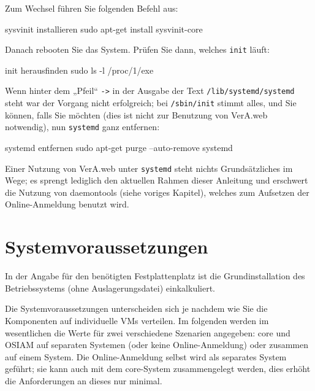 \documentclass{tarentanleitung}
\begin{document}
\begin{minipage}{\linewidth}
Zum Wechsel führen Sie folgenden Befehl aus:

\begin{lstdump}{sysvinit installieren}
sudo apt-get install sysvinit-core
\end{lstdump}

Danach rebooten Sie das System. Prüfen Sie dann, welches \texttt{init} läuft:

\begin{lstdump}{init herausfinden}
sudo ls -l /proc/1/exe
\end{lstdump}

Wenn hinter dem „Pfeil“ \texttt{->} in der Ausgabe der Text
\texttt{/lib/systemd/systemd} steht war der Vorgang nicht
erfolgreich; bei \texttt{/sbin/init} stimmt alles, und Sie
können, falls Sie möchten (dies ist nicht zur Benutzung von
VerA.web notwendig), nun \texttt{systemd} ganz entfernen:

\begin{lstdump}{systemd entfernen}
sudo apt-get purge --auto-remove systemd
\end{lstdump}
\end{minipage}

Einer Nutzung von VerA.web unter \texttt{systemd} steht
nichts Grundsätzliches im Wege; es sprengt lediglich den
aktuellen Rahmen dieser Anleitung und erschwert die
Nutzung von daemontools (siehe voriges Kapitel), welches
zum Aufsetzen der Online-Anmeldung benutzt wird.

\section{Systemvoraussetzungen}\label{sec:requirements}

In der Angabe für den benötigten Festplattenplatz ist die
Grundinstallation des Betriebssystems (ohne Auslagerungsdatei)
einkalkuliert.

Die Systemvoraussetzungen unterscheiden sich je nachdem wie Sie die
Komponenten auf individuelle VMs verteilen. Im folgenden werden im
wesentlichen die Werte für zwei verschiedene Szenarien angegeben:
core und OSIAM auf separaten Systemen (oder keine Online-Anmeldung)
oder zusammen auf einem System. Die Online-Anmeldung selbst wird
als separates System geführt; sie kann auch mit dem core-System
zusammengelegt werden, dies erhöht die Anforderungen an dieses nur
minimal.
\end{document}
